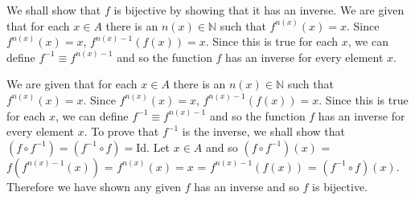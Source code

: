 \documentclass[12pt,letterpaper,reqno]{amsart}
\newcommand{\N}{\mathbb N}
\begin{document}
\begin{enumerate}
\begin{flushleft}

We shall show that $f$ is bijective by showing that it has an inverse. We are given that for each $x \in A$ there is an $n(x) \in \N$ such that $f^{n(x)}(x) = x$. Since $f^{n(x)}(x) = x$, $f^{n(x)-1}(f(x)) = x$. Since this is true for each $x$, we can define $f^{-1} \equiv f^{n(x)-1}$ and so the function $f$ has an inverse for every element $x$.
\newline

\iffalse
We are given that $\forall x \in A$, $\exists\, n(x) \in \N$ s.t. $f^{n(x)}(x) = x$ and wish to show that $f$ is both injective and surjective. To show that $f$ is injective, we wish to show that $f(a) = f(b) \Rightarrow a = b$. So if we are given that $f(a) = f(b)$, we are also given that $\exists\, n(a) \in \N$ s.t. $f^{n(a)}(a) = a$. Applying the function $f$ to both sides, we get $f(f^{n(a)}(a)) = f(a)$. Therefore, $f^{n(a)+1}(a) = f(a) = f(b)$. Similarly, we are given that $\exists\, n(b) \in \N$ s.t. $f^{n(b)}(b) = b$. Applying $f$ to both sides again, we get $f^{n(b)+1}(b) = f(b) = f(a)$. Since the two equations equal the same elements $f(a)$ and $f(b)$, we know that $f^{n(a)+1}(a) = f^{n(b)+1}(b)$.
\newline
\fi

We are given that for each $x \in A$ there is an $n(x) \in \N$ such that $f^{n(x)}(x) = x$. Since $f^{n(x)}(x) = x$, $f^{n(x)-1}(f(x)) = x$. Since this is true for each $x$, we can define $f^{-1} \equiv f^{n(x)-1}$ and so the function $f$ has an inverse for every element $x$. To prove that $f^{-1}$ is the inverse, we shall show that $(f \circ f^{-1}) = (f^{-1} \circ f) = \text{Id}$. Let $x \in A$ and so $(f \circ f^{-1})(x)$ =  $f(f^{n(x)-1}(x))$ = $f^{n(x)}(x) = x$ = $f^{n(x)-1}(f(x))$ =  $(f^{-1} \circ f)(x)$. Therefore we have shown any given $f$ has an inverse and so $f$ is bijective.
\newline


\end{flushleft}
\end{enumerate}
\end{document}
